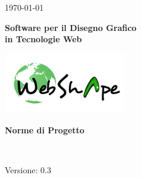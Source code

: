 
\title{\TITOLODOC}
\author{Geremia Mirco}



\renewcommand{\insertversion}{0.3} %
\renewcommand{\TITOLODOC}{Norme di Progetto} %
\renewcommand{\glosspath}{.\glossario} %

\begin{titlepage}
\begin{center}
	\begin{Large}	\today \end{Large}
\end{center}

\vspace{20pt}

\begin{center}
	\begin{Huge}
				\textbf{\ajax}
	\end{Huge}
\end{center}			

\begin{center}
	\begin{large}
				\textbf{Software per il Disegno Grafico\\ in Tecnologie Web}
	\end{large}
\end{center}			

\vspace{20pt}

\begin{center}
\includegraphics[width=150pt]{../logo/logo}
\end{center}

\vspace{170pt}
\begin{center} %
	\begin{Huge}
				\textbf{\TITOLODOC}
	\end{Huge}
			\\
\end{center}
\vspace{210pt}
\begin{center}
Versione: \insertversion
\end{center}
\end{titlepage}

